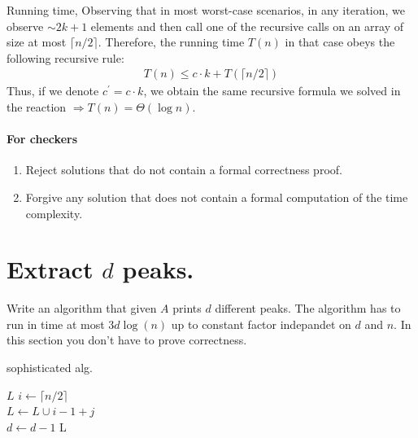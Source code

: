 Running time, Observing that in most worst-case scenarios, in any iteration, we observe $\sim 2k+1$ elements and then call one of the recursive calls on an array of size at most $\lceil n /2 \rceil$. Therefore, the running time $T(n)$ in that case obeys the following recursive rule:
\begin{equation*}
  \begin{split}
    T\left( n \right) \le c\cdot k + T\left( \lceil n / 2\rceil  \right)
  \end{split}
\end{equation*}
Thus, if we denote $c^{\prime}=c\cdot k$, we obtain the same recursive formula we solved in the reaction $\Rightarrow T\left( n \right) = \Theta\left( \log n \right)$.

\fi
\ifdefined\CHECK 
\paragraph{For checkers}
\begin{enumerate}
  \item Reject solutions that do not contain a formal correctness proof.
  \item Forgive any solution that does not contain a formal computation of the time complexity.
\end{enumerate}
\fi

\ifdefined\DPEAK

\section{Extract $d$ peaks.} Write an algorithm that given $A$ prints $d$ different peaks. The algorithm has to run in time at most $3d\log(n)$ up to constant factor indepandet on $d$ and $n$. In this section you don't have to prove correctness. 

\ifdefined\SOLUTION

 \begin{algorithm}
\caption{sophisticated alg.}
  \label{alg:count}
   {
    \Return  $L$
 }
$ i \leftarrow  \lceil n/2 \rceil $\\
         { 
           {
            $ L \leftarrow L \cup i -1 + j $  \\
             $d \leftarrow d -1$
           }
          } 
        \Return L     
\end{algorithm}

